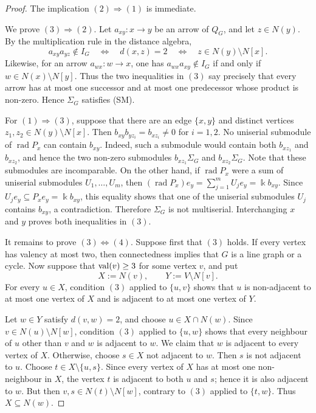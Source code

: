 \documentclass[a4paper,leqno]{amsart}
\begin{document}
\begin{proof}
The implication $(2)\Rightarrow(1)$ is immediate.

We prove $(3)\Rightarrow(2)$. Let $a_{xy}:x\to y$ be an arrow of $Q_G$, and let $z\in N(y)$. By the multiplication rule in the distance algebra,
$$a_{xy}a_{yz}\notin I_G
\quad\Longleftrightarrow\quad
d(x,z)=2
\quad\Longleftrightarrow\quad
z\in N(y)\setminus N[x].$$
Likewise, for an arrow $a_{wx}:w\to x$, one has
$a_{wx}a_{xy}\notin I_G$ if and only if $w\in N(x)\setminus N[y]$.
Thus the two inequalities in $(3)$ say precisely that every arrow has at most one successor and at most one predecessor whose product is non-zero. Hence $\Sigma_G$ satisfies (SM).

For $(1)\Rightarrow(3)$, suppose that there are an edge $\{x,y\}$ and
distinct vertices $z_1,z_2\in N(y)\setminus N[x]$. Then
$b_{xy}b_{yz_i}=b_{xz_i}\neq0$ for $i=1,2$. No uniserial submodule of $\operatorname{rad}P_x$ can contain $b_{xy}$. Indeed, such a submodule would contain both $b_{xz_1}$ and $b_{xz_2}$, and hence the two non-zero submodules $b_{xz_1}\Sigma_G$ and $b_{xz_2}\Sigma_G$. Note that these submodules are incomparable. On the other hand, if $\operatorname{rad}P_x$ were a sum of uniserial submodules $U_1,\ldots,U_m$, then $(\operatorname{rad}P_x)e_y=\sum_{j=1}^m U_je_y=\Bbbk b_{xy}$. Since $U_je_y\subseteq P_xe_y=\Bbbk b_{xy}$, this equality shows that one of the uniserial submodules $U_j$ contains $b_{xy}$, a contradiction. Therefore $\Sigma_G$ is not multiserial. Interchanging $x$ and $y$ proves both inequalities in $(3)$.

It remains to prove $(3)\Longleftrightarrow(4)$. Suppose first that $(3)$ holds. If every vertex has valency at most two, then connectedness implies that $G$ is a line graph or a cycle. Now suppose that $\operatorname{val}(v)\geq3$ for some vertex $v$, and put
$$X:=N(v),\qquad Y:=V\setminus N[v].$$
For every $u\in X$, condition $(3)$ applied to $\{u,v\}$ shows that $u$ is non-adjacent to at most one vertex of $X$ and is adjacent to at most one vertex of $Y$.

Let $w\in Y$ satisfy $d(v,w)=2$, and choose $u\in X\cap N(w)$. Since $v\in N(u)\setminus N[w]$,
condition $(3)$ applied to $\{u,w\}$ shows that every neighbour of $u$ other than $v$ and $w$ is adjacent to $w$. We claim that $w$ is adjacent to every vertex of $X$. Otherwise, choose $s\in X$ not adjacent to $w$. Then $s$ is not adjacent to $u$. Choose $t\in X\setminus\{u,s\}$. Since every vertex of $X$ has at most one non-neighbour in $X$, the vertex $t$ is adjacent to both $u$ and $s$; hence it is also adjacent to $w$. But then $v,s\in N(t)\setminus N[w]$, contrary to $(3)$ applied to $\{t,w\}$. Thus $X\subseteq N(w)$.


\end{proof}
\end{document}
